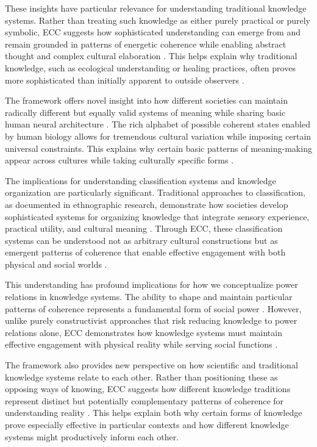 \begin{refsection}
These insights have particular relevance for understanding traditional knowledge systems. Rather than treating such knowledge as either purely practical or purely symbolic, ECC suggests how sophisticated understanding can emerge from and remain grounded in patterns of energetic coherence while enabling abstract thought and complex cultural elaboration \cite{varela1991embodied}. This helps explain why traditional knowledge, such as ecological understanding or healing practices, often proves more sophisticated than initially apparent to outside observers \cite{jackson1996things}.

The framework offers novel insight into how different societies can maintain radically different but equally valid systems of meaning while sharing basic human neural architecture \cite{merleau1962phenomenology}. The rich alphabet of possible coherent states enabled by human biology allows for tremendous cultural variation while imposing certain universal constraints. This explains why certain basic patterns of meaning-making appear across cultures while taking culturally specific forms \cite{throop2003articulating}.

The implications for understanding classification systems and knowledge organization are particularly significant. Traditional approaches to classification, as documented in ethnographic research, demonstrate how societies develop sophisticated systems for organizing knowledge that integrate sensory experience, practical utility, and cultural meaning \cite{ellen2016cultural}. Through ECC, these classification systems can be understood not as arbitrary cultural constructions but as emergent patterns of coherence that enable effective engagement with both physical and social worlds \cite{levi1966savage}.

This understanding has profound implications for how we conceptualize power relations in knowledge systems. The ability to shape and maintain particular patterns of coherence represents a fundamental form of social power \cite{foucault1980power}. However, unlike purely constructivist approaches that risk reducing knowledge to power relations alone, ECC demonstrates how knowledge systems must maintain effective engagement with physical reality while serving social functions \cite{scott1998seeing}.

The framework also provides new perspective on how scientific and traditional knowledge systems relate to each other. Rather than positioning these as opposing ways of knowing, ECC suggests how different knowledge traditions represent distinct but potentially complementary patterns of coherence for understanding reality \cite{latour1999pandora}. This helps explain both why certain forms of knowledge prove especially effective in particular contexts and how different knowledge systems might productively inform each other.


\end{refsection}
